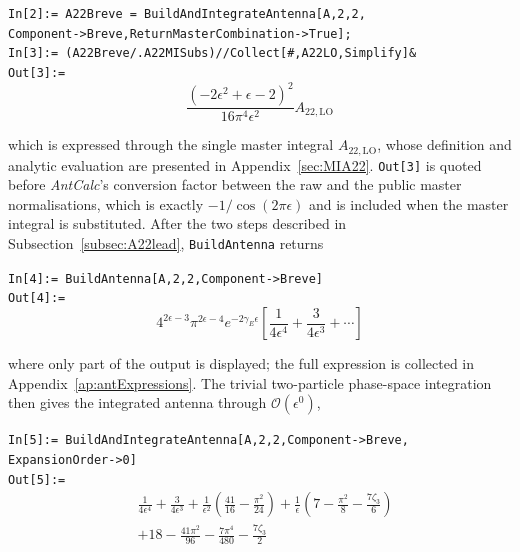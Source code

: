 \begin{mdframed}[backgroundcolor=gray!10, linewidth=0pt]
\texttt{In[2]:= A22Breve = BuildAndIntegrateAntenna[A,2,2,\\Component->Breve,ReturnMasterCombination->True];}\\
\texttt{In[3]:= (A22Breve/.A22MISubs)//Collect[\#,A22LO,Simplify]\&}\\
\hfill
\texttt{Out[3]:=}
    \begin{equation*}
        \frac{\left(-2\epsilon^2+\epsilon-2\right)^2}{16\pi^4\epsilon^2}A_{22,\text{LO}}
    \end{equation*}
\end{mdframed}
which is expressed through the single master integral $A_{22,\mathrm{LO}}$, whose definition and
analytic evaluation are presented in Appendix~\ref{sec:MIA22}. \texttt{Out[3]} is quoted before
\textit{AntCalc}'s conversion factor between the raw and the public master normalisations, which is
exactly $-1/\cos(2\pi\epsilon)$ and is included when the master integral is substituted. After the
two steps described in Subsection~\ref{subsec:A22lead}, \texttt{BuildAntenna} returns

\begin{mdframed}[backgroundcolor=gray!10, linewidth=0pt]
\texttt{In[4]:= BuildAntenna[A,2,2,Component->Breve]}\\
\hfill
\texttt{Out[4]:=}
    \begin{equation*}
4^{2\epsilon-3}\pi^{2\epsilon-4}e^{-2\gamma_E\epsilon}\left[\frac1{4\epsilon^4}+\frac3{4\epsilon^3}+\cdots\right]
    \end{equation*}
\end{mdframed}

where only part of the output is displayed; the full expression is collected in
Appendix~\ref{ap:antExpressions}. The trivial two-particle phase-space integration then gives the
integrated antenna through $\mathcal O(\epsilon^0)$,

\begin{mdframed}[backgroundcolor=gray!10, linewidth=0pt]
\texttt{In[5]:= BuildAndIntegrateAntenna[A,2,2,Component->Breve,\\ExpansionOrder->0]}\\
\hfill
\texttt{Out[5]:=}
    \begin{equation*}
        \begin{split}
            &\frac1{4\epsilon^4}+\frac3{4\epsilon^3}+\frac{1}{\epsilon^2}\left(\frac{41}{16}-\frac{\pi^2}{24}\right)+\frac{1}{\epsilon}\left(7-\frac{\pi^2}8-\frac{7\zeta_3}{6}\right)\\
            &+18-\frac{41\pi^2}{96}-\frac{7\pi^4}{480}-\frac{7\zeta_3}{2}
        \end{split}
    \end{equation*}
\end{mdframed}


